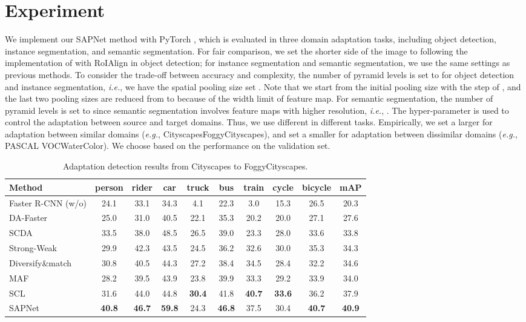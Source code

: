 \documentclass[runningheads]{llncs}
\def\eg{{\em e.g.}}
\def\ie{{\em i.e.}}
\begin{document}
\section{Experiment}
We implement our SAPNet method with PyTorch \cite{paszke2017automatic}, which is evaluated in three domain adaptation tasks, including object detection, instance segmentation, and semantic segmentation. For fair comparison, we set the shorter side of the image to  following the implementation of \cite{DBLP:conf/cvpr/SaitoUHS19,DBLP:journals/corr/abs-1911-02559} with RoIAlign \cite{DBLP:conf/iccv/HeGDG17} in object detection; for instance segmentation and semantic segmentation, we use the same settings as previous methods. To consider the trade-off between accuracy and complexity, the number of pyramid levels is set to  for object detection and instance segmentation, \ie, we have the spatial pooling size set . Note that we start from the initial pooling size  with the step of , and the last two pooling sizes are reduced from  to  because of the width limit of feature map. For semantic segmentation, the number of pyramid levels is set to  since semantic segmentation involves feature maps with higher resolution, \ie, . The hyper-parameter  is used to control the adaptation between source and target domains. Thus, we use different  in different tasks. Empirically, we set a larger  for adaptation between similar domains (\eg, CityscapesFoggyCityscapes), and set a smaller  for adaptation between dissimilar domains (\eg, PASCAL VOCWaterColor). We choose  based on the performance on the validation set.
\begin{table*}[t]
\centering
\caption{Adaptation detection results from Cityscapes to FoggyCityscapes.}
\setlength{\tabcolsep}{2.5pt}
\begin{tabular}{l|cccccccc|c}
\hline
Method  &person &rider &car &truck &bus &train &cycle &bicycle &mAP \\
\hline
Faster R-CNN (w/o)     & 24.1& 33.1& 34.3& 4.1 & 22.3& 3.0 & 15.3& 26.5&  20.3 \\
DA-Faster \cite{DBLP:conf/cvpr/Chen0SDG18}& 25.0& 31.0& 40.5& 22.1& 35.3& 20.2& 20.0& 27.1&  27.6 \\
SCDA \cite{DBLP:conf/cvpr/ZhuPYSL19}&33.5 & 38.0 & 48.5 &26.5 &39.0 &23.3 &28.0 &33.6 &33.8 \\
Strong-Weak \cite{DBLP:conf/cvpr/SaitoUHS19} & 29.9& 42.3& 43.5& 24.5& 36.2& 32.6& 30.0& 35.3&  34.3 \\
Diversify\&match \cite{DBLP:conf/cvpr/KimJKCK19}& 30.8& 40.5& 44.3& 27.2& 38.4& 34.5& 28.4& 32.2&  34.6 \\
MAF \cite{DBLP:journals/corr/abs-1907-10343}         & 28.2& 39.5& 43.9& 23.8& 39.9& 33.3& 29.2& 33.9& 34.0\\
SCL \cite{DBLP:journals/corr/abs-1911-02559}         & 31.6& 44.0& 44.8& {\bf 30.4}& 41.8& {\bf 40.7}& {\bf 33.6}& 36.2&  37.9 \\
\hline
SAPNet                          &{\bf 40.8} &{\bf 46.7} &{\bf 59.8} &24.3 &{\bf 46.8} &37.5 &30.4 &{\bf 40.7} &{\bf 40.9} \\
\hline
\end{tabular}
\label{tab:city2foggy}
\end{table*}
\end{document}
